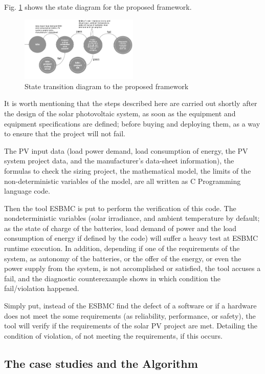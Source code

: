 \documentclass[journal]{IEEEtran}
\begin{document}
Fig. \ref{fig:statetransition} shows the state diagram for the proposed framework. 

\begin{figure}[h]
\includegraphics[width=0.5\textwidth]{statetransition}
\centering
\caption{State transition diagram to the proposed framework}
\label{fig:statetransition}
\end{figure}

It is worth mentioning that the steps described here are carried out shortly after the design of the solar photovoltaic system, as soon as the equipment and equipment specifications are defined; before buying and deploying them, as a way to ensure that the project will not fail. 

The PV input data (load power demand, load consumption of energy, the PV system project data, and the manufacturer's data-sheet information), the formulas to check the sizing project, the mathematical model, the limits of the non-deterministic variables of the model, are all written as C Programming language code. 

Then the tool ESBMC is put to perform the verification of this code. The nondeterministic variables (solar irradiance, and ambient temperature by default; as the  state of charge of the batteries, load demand of power and the load consumption of energy if defined by the code) will suffer a heavy test at ESBMC runtime execution. In addition, depending if one of the requirements of the system, as autonomy of the batteries, or the offer of the energy, or even the power supply from the system, is not accomplished or satisfied, the tool accuses a fail, and the diagnostic counterexample shows in which condition the fail/violation happened. 

Simply put, instead of the ESBMC find the defect of a software or if a hardware does not meet the some requirements (as reliability, performance, or safety), the tool will verify if the requirements of the solar PV project are met. Detailing the condition of violation, of not meeting the requirements, if this occurs. 

\subsection{The case studies and the Algorithm}
\end{document}
